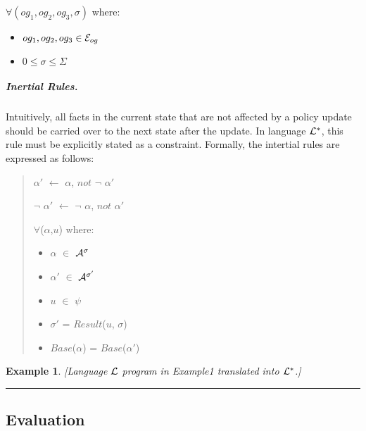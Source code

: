 \documentclass[10pt, twocolumn]{article}
\newtheorem{examp}{Example}
\newenvironment{example}{\begin{examp}\rm}{\rule{2mm}{2mm}\end{examp}}
\begin{document}
\begin{enumerate}
                $\forall (og_{1}, og_{2}, og_{3}, \sigma)$ where:

                \begin{itemize}
                  \item
                    $og_{1}, og_{2}, og_{3} \in {\cal E}_{og}$
                  \item
                    $0 \leq \sigma \leq \Sigma$
                \end{itemize}
            \end{enumerate}

          \subparagraph{Inertial Rules.}

            Intuitively, all facts in the current state that are not affected
            by a policy update should be carried over to the next state after
            the update. In language ${\cal L}^{*}$, this rule must be
            explicitly stated as a constraint. Formally, the intertial rules
            are expressed as follows:

            \begin{quote}
              $\alpha'$ $\leftarrow$ $\alpha$, $not$ $\lnot$ $\alpha'$

              $\lnot$ $\alpha'$ $\leftarrow$ $\lnot$ $\alpha$, $not$ $\alpha'$

              $\forall$($\alpha$,$u$) where:

              \begin{itemize}
                \item
                  $\alpha$ $\in$ ${\cal A}^{\sigma}$
                \item
                  $\alpha'$ $\in$ ${\cal A}^{\sigma'}$
                \item
                  $u$ $\in$ $\psi$
                \item
                  $\sigma'$ = $Result$($u$, $\sigma$)
                \item
                  $Base$($\alpha$) = $Base$($\alpha'$)
              \end{itemize}
            \end{quote}

        \begin{example}
          [Language ${\cal L}$ program in Example1 translated into
          ${\cal L}^{*}$.]

        \end{example}

      \subsection{Evaluation}
\end{document}

